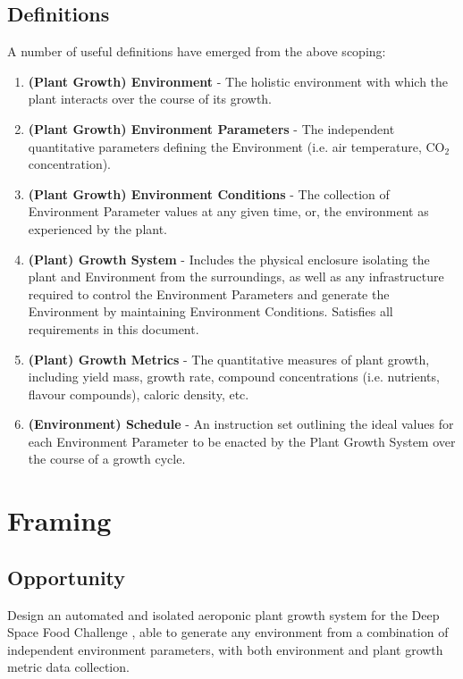 \documentclass{../tex/report}
\begin{document}
\clearpage
\subsection{Definitions}
\label{sec:definitions}

A number of useful definitions have emerged from the above scoping:
\begin{enumerate}
    \item \textbf{(Plant Growth) Environment} - The holistic environment with which the plant interacts over the course of its growth.
    \item \textbf{(Plant Growth) Environment Parameters} - The independent quantitative parameters defining the Environment (i.e. air temperature, CO${}_2$ concentration).
    \item \textbf{(Plant Growth) Environment Conditions} - The collection of Environment Parameter values at any given time, or, the environment as experienced by the plant.
    \item \textbf{(Plant) Growth System} - Includes the physical enclosure isolating the plant and Environment from the surroundings, as well as any infrastructure required to control the Environment Parameters and generate the Environment by maintaining Environment Conditions. Satisfies all requirements in this document.
    \item \textbf{(Plant) Growth Metrics} - The quantitative measures of plant growth, including yield mass, growth rate, compound concentrations (i.e. nutrients, flavour compounds), caloric density, etc.
    \item \textbf{(Environment) Schedule} - An instruction set outlining the ideal values for each Environment Parameter to be enacted by the Plant Growth System over the course of a growth cycle.
\end{enumerate}

\clearpage
\section{Framing}
\label{sec:framing}

\subsection{Opportunity}
\label{sec:opportunity}

Design an automated and isolated aeroponic plant growth system for the Deep Space Food Challenge \cite{dsfc}, able to generate any environment from a combination of independent environment parameters, with both environment and plant growth metric data collection.
\end{document}
